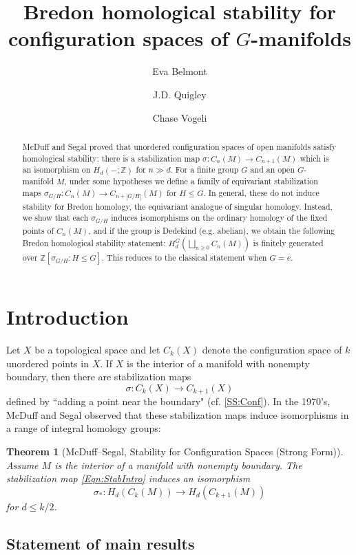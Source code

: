\documentclass[11pt]{amsart}
\author{Eva Belmont}\address{Case Western Reserve University}\email{eva.belmont@case.edu}
\author{J.D. Quigley}\address{University of Virginia}\email{mbp6pj@virginia.edu}
\author{Chase Vogeli}\address{Cornell University}\email{cpv29@cornell.edu}
\title{Bredon homological stability for configuration spaces of $G$-manifolds}
\newtheorem{thm}[equation]{Theorem}
\theoremstyle{definition}
\numberwithin{equation}{subsection} %
\newcommand{\Z}{\mathbb{Z}}
\begin{document}
\begin{abstract}
McDuff and Segal proved that unordered configuration spaces of open manifolds satisfy
homological stability: there is a stabilization map $\sigma: C_n(M)\to
C_{n+1}(M)$ which is an isomorphism on $H_d(-;\Z)$ for $n\gg d$.
For a finite group $G$ and an open $G$-manifold $M$, under some hypotheses we
define a family of equivariant stabilization maps $\sigma_{G/H}:C_n(M)\to
C_{n+|G/H|}(M)$ for $H\leq G$. In general, these do not induce
stability for Bredon homology, the equivariant analogue of singular homology. Instead, we show that each $\sigma_{G/H}$ induces
isomorphisms on the ordinary homology of the fixed points of $C_n(M)$,
and if the group is Dedekind (e.g. abelian), we obtain the following Bredon
homological stability statement: $H^G_d(\bigsqcup_{n\geq 0}C_n(M))$ is finitely
generated over $\Z[\sigma_{G/H} : H\leq G]$. This reduces to the classical
statement when $G=e$.
\end{abstract}

\maketitle

\tableofcontents

\section{Introduction}

Let $X$ be a topological space and let $C_k(X)$ denote the configuration space of $k$ unordered points in $X$. If $X$ is the interior of a manifold with nonempty boundary, then there are stabilization maps
\begin{equation}\label{Eqn:StabIntro}
\sigma: C_k(X) \to C_{k+1}(X)
\end{equation}
defined by ``adding a point near the boundary" (cf. \cref{SS:Conf}). In the 1970's, McDuff \cite{McD75} and Segal \cite{Seg79} observed that these stabilization maps induce isomorphisms in a range of integral homology groups:

\begin{thm}[McDuff--Segal, Stability for Configuration Spaces (Strong Form)]\label{Thm:MS}
Assume $M$ is the interior of a manifold with nonempty boundary. The stabilization map \eqref{Eqn:StabIntro} induces an isomorphism
$$\sigma_*: H_d (C_k(M)) \to H_d(C_{k+1}(M))$$
for $d \leq k/2$. 
\end{thm}


\subsection{Statement of main results}
\end{document}
